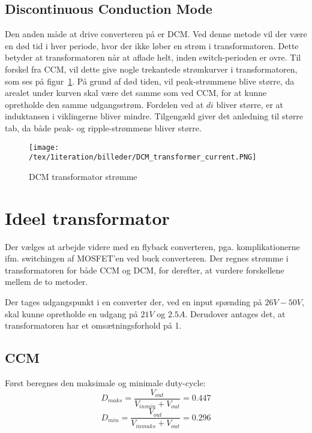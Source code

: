 \subsection{Discontinuous Conduction Mode}
Den anden måde at drive converteren på er DCM. Ved denne metode vil der være en død tid i hver periode, hvor der ikke løber en strøm i transformatoren. Dette betyder at transformatoren når at aflade helt, inden switch-perioden er ovre. Til forskel fra CCM, vil dette give nogle trekantede strømkurver i transformatoren, som ses på figur~\ref{fig:DCM_transformer_current}.
På grund af død tiden, vil peak-strømmene blive større, da arealet under kurven skal være det samme som ved CCM, for at kunne opretholde den samme udgangsstrøm. 
Fordelen ved at $di$ bliver større, er at induktansen i viklingerne bliver mindre. Tilgengæld giver det anledning til større tab, da både peak- og ripple-strømmene bliver større.

\begin{figure}[H]
	\center
	\texttt{[image: /tex/1iteration/billeder/DCM\_transformer\_current.PNG]}
	\caption{DCM transformator strømme
		\cite{SMPS-topologies}}
	\label{fig:DCM_transformer_current}
\end{figure}


\section{Ideel transformator}
Der vælges at arbejde videre med en flyback converteren, pga. komplikationerne ifm. switchingen af MOSFET'en ved buck converteren.
Der regnes strømme i transformatoren for både CCM og DCM, for derefter, at vurdere forskellene mellem de to metoder.

\noindent Der tages udgangspunkt i en converter der, ved en input spænding på $26V-50V$, skal kunne opretholde en udgang på $21V$ og $2.5A$. Derudover antages det, at transformatoren har et omsætningsforhold på 1.

\subsection{CCM} \label{maksimum_duty_cycle}
Først beregnes den maksimale og minimale duty-cycle:
\begin{equation} \label{D_maks_CCM}
D_{maks} = \frac{V_{out}}{V_{inmin} + V_{out}} = 0.447
\end{equation}
\begin{equation} \label{D_min_CCM}
D_{min} = \frac{V_{out}}{V_{inmaks} + V_{out}} = 0.296
\end{equation}

